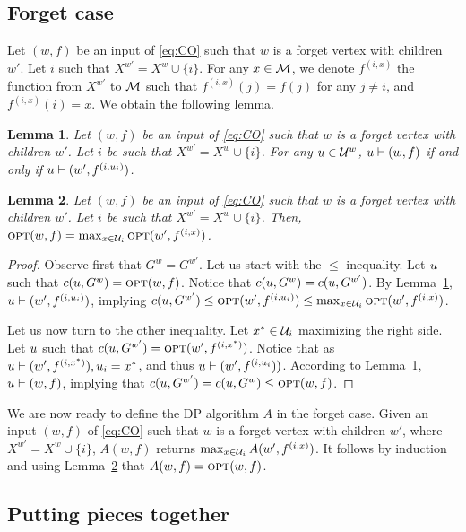 \documentclass[12pt]{article}
\newtheorem{lemma}{Lemma}
\newcommand{\blue}[1]{{\color{black}#1}}
\begin{document}
\begin{appendix}
\subsection{Forget case}
Let $(w,f)$ be an input of \ref{eq:CO} such that $w$ is a forget vertex with children $w'$.
Let $i$ such that $X^{w'} = X^{w} \cup \{i\}$.
For any $x \in \mathcal{M}$, we denote $f^{(i,x)}$ the function from $X^{w'}$ to $\mathcal{M}$ such that $f^{(i,x)}(j)=f(j)$ for any $j \neq i$,
and $f^{(i,x)}(i)=x$.
\blue{We obtain the following lemma}.
\begin{lemma}\label{lemma:forget1}
  Let $(w,f)$ be an input of \ref{eq:CO} such that $w$ is a forget vertex with children $w'$.
  Let $i$ be such that $X^{w'} = X^{w} \cup \{i\}$.
  For any $u \in \mathcal{U}^w$, $u \vdash (w,f)$ if and only if $u \vdash (w',f^{(i,u_i)})$.
\end{lemma}


\begin{lemma}\label{lemma:forget2}
  Let $(w,f)$ be an input of \ref{eq:CO} such that $w$ is a forget vertex with children $w'$.
  Let $i$ be such that $X^{w'} = X^{w} \cup \{i\}$. Then, 
  $\mbox{\textsc{opt}}(w,f) = \max_{x \in \mathcal{U}_i}\mbox{\textsc{opt}}(w',f^{(i,x)})$.
\end{lemma}

\begin{proof} 
  Observe first that $G^w = G^{w'}$.
  Let us start with the $\le$ inequality.
  Let $u$ such that $c(u,G^w)=\mbox{\textsc{opt}}(w,f)$. Notice that $c(u,G^w)=c(u,G^{w'})$.
  By Lemma~\ref{lemma:forget1}, $u \vdash (w',f^{(i,u_i)})$, implying $c(u,G^{w'}) \le \mbox{\textsc{opt}}(w',f^{(i,u_i)}) \le \max_{x \in \mathcal{U}_i}\mbox{\textsc{opt}}(w',f^{(i,x)})$.
  
  Let us now turn to the other inequality.
  Let $x^* \in \mathcal{U}_i$ maximizing the right side.
  Let $u$ such that $c(u,G^{w'})=\mbox{\textsc{opt}}(w',f^{(i,x^*)})$. Notice that as $u \vdash (w',f^{(i,x^*)}), u_i = x^*$, and thus $u \vdash (w',f^{(i,u_i}))$.
  According to Lemma~\ref{lemma:forget1}, $u \vdash (w,f)$, implying that $c(u,G^{w'}) = c(u,G^{w}) \le \mbox{\textsc{opt}}(w,f)$.
\end{proof}


We are now ready to define the DP algorithm $A$ in the forget case.
Given an input $(w,f)$ of \ref{eq:CO} such that $w$ is a forget vertex with children $w'$, where $X^{w'} = X^{w} \cup \{i\}$,
$A(w,f)$ returns $\max_{x \in \mathcal{U}_i}A(w',f^{(i,x)})$.
It \blue{follows} by induction and using Lemma~\ref{lemma:forget2} that $A(w,f)=\mbox{\textsc{opt}}(w,f)$.

\subsection{Putting pieces together}



\end{appendix}
\end{document}
